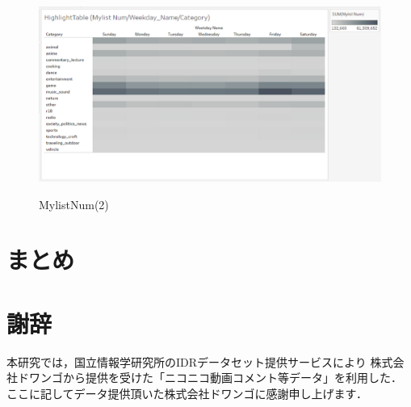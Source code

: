 \documentclass[submit,techrep,noauthor]{ipsj}
\begin{document}
\begin{figure}[h]
\begin{minipage}[b]{0.49\columnwidth}
    \label{fig:highlighttable_mylist_weekdaynamemonth}
  \end{minipage}
  \begin{minipage}[b]{0.49\columnwidth}
    \centering
    \includegraphics[width=\columnwidth]{./eps/HighlightTable_MylistNum_WeekdayNameCategory.eps}
    \label{fig:highlighttable_mylist_weekdaynamecategory}
  \end{minipage}
  \vspace{-1.0zh}
  \caption{MylistNum(2)}
  \label{fig:highlighttable_mylist_numweekday}
  \vspace{-1.0zh}
\end{figure}


\newpage


\section{まとめ}





\section*{謝辞}
本研究では，国立情報学研究所のIDRデータセット提供サービスにより
株式会社ドワンゴから提供を受けた「ニコニコ動画コメント等データ」を利用した．
ここに記してデータ提供頂いた株式会社ドワンゴに感謝申し上げます．\\




\end{document}
